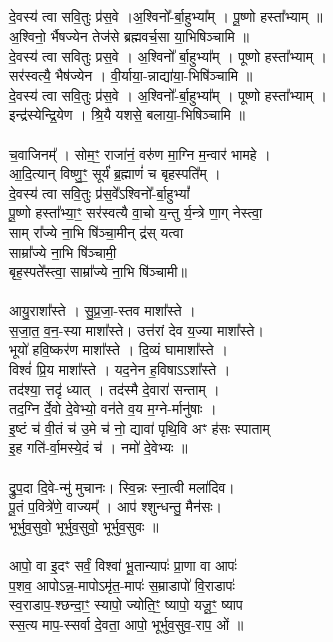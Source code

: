 \subsection{}
दे॒वस्य॑ त्वा सवि॒तुः प्र॑स॒वे ।अ॒श्विनो᳚-र्बा॒हुभ्या᳚म् । पू॒ष्णो हस्ता᳚भ्याम् ॥\\
अ॒श्विनो॒ र्भैषज्येन  तेज॑से ब्रह्मवर्च॒सा या॒भिषिञ्चामि ॥ \\
दे॒वस्य॑ त्वा सवितुः प्रस॒वे । अ॒श्विनो᳚ र्बा॒हुभ्या᳚म् । पूष्णो हस्ता᳚भ्याम् ।\\
सर॑स्वत्यै॒ भैष॑ज्येन । वी॒र्याया॒-न्नाद्या॑या॒-भिषि॑ञ्चामि ॥ \\
दे॒वस्य॑ त्वा सवि॒तुः प्र॑स॒वे । अ॒श्विनो᳚-र्बा॒हुभ्या᳚म् । पूष्णो हस्ता᳚भ्याम् ।\\
इन्द्र॑स्येन्द्रि॒येण । श्रि॒यै यशसे॒ बलाया॒-भिषिञ्चामि ॥\\
\\
च॒वाजिनम्᳚ । सोम॒ꣳ॒ राजा॑नं॒ वरु॑ण मा॒ग्नि म॒न्वार॑ भामहे ।\\
आ॒दि॒त्यान् विष्णु॒ꣳ॒ सूर्यं॑ ब्र॒ह्माणं॑ च बृहस्पति᳚म् ।\\
दे॒वस्य॑ त्वा सवि॒तुः प्र॑स॒वे᳚ऽश्विनो᳚-र्बा॒हुभ्यां᳚ \\
पू॒ष्णो हस्ता᳚भ्या॒ꣳ॒ सर॑स्वत्यै वा॒चो य॒न्तु र्य॒न्त्रे णा॒ग् नेस्त्वा॒ \\
साम् रा᳚ज्ये ना॒भि षि॑ञ्चा॒मीन् द्र॑स् यत्वा \\
साम्रा᳚ज्ये ना॒भि षि॑ञ्चामी॒\\
बृह॒स्पते᳚स्त्वा॒ साम्रा᳚ज्ये ना॒भि षि॑ञ्चामी॥\\
\\
आयु॒राशा᳚स्ते । सु॒प्र॒जा॒-स्तव माशा᳚स्ते ।\\
स॒जा॒त॒ व॒न॒-स्या माशा᳚स्ते। उत्त॑रां देव य॒ज्या माशा᳚स्ते। \\
भूयो॑ हवि॒ष्कर॑ण माशा᳚स्ते । दि॒व्यं घामाशा᳚स्ते ।\\
विश्वं॑ प्रि॒य माशा᳚स्ते । यद॒नेन ह॒विषाऽऽशा᳚स्ते ।\\
तद॑श्या॒ त्तदृ॑ ध्यात् । तद॑स्मै दे॒वारा॑ सन्ताम् ।\\
तद॒ग्नि र्दे॒वो दे॒वेभ्यो॒ वन॑ते व॒य म॒ग्ने-र्मानु॑षाः ।\\
इ॒ष्टं च॑ वी॒तं च॑ उ॒मे च॑ नो॒ द्यावा॑ पृथि॒वि अꣳ ह॑सः स्पाताम् \\
इ॒ह गति॑-र्वा॒मस्ये॒दं च॑ । नमो॑ दे॒वेभ्यः ॥\\
\\
द्रु॒प॒दा दि॒वे-न्मु॑ मुचानः। स्वि॒न्नः स्ना॒त्वी मला॑दिव। \\
पू॒तं प॒वित्रे॑णे॒ वाज्यम्᳚ । आप॑ श्शुन्धन्तु॒ मैन॑सः। \\
भूर्भुव॒सुवो॒ भूर्भुव॒सुवो॒ भूर्भुव॒सुवः ॥\\
\\
आपो॒ वा इ॒दꣳ सर्वं॒ विश्वा॑ भू॒तान्यापः॑ प्रा॒णा वा आपः॑ \\
प॒शव॒ आपोऽन्न॒-मापोऽमृ॑त॒-मापः॑ स॒म्राडापो॑ वि॒राडापः॑ \\
स्व॒राडाप॒-श्छन्दा॒ꣳ॒ स्यापो॒ ज्योति॒ꣳ॒ ष्यापो॒ यजू॒ꣳ॒ ष्याप \\
स्स॒त्य माप॒-स्सर्वा दे॒वता॒ आपो॒ भूर्भुव॒सुव॒-राप॒ ओं ॥\\
